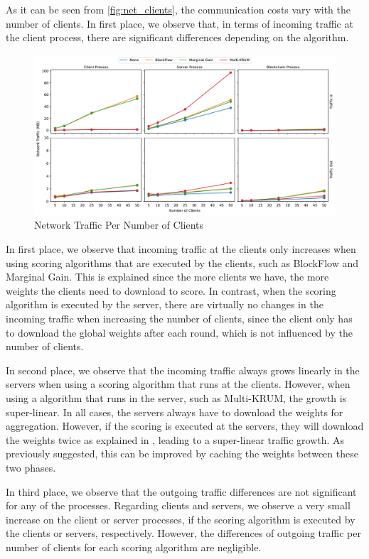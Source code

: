 As it can be seen from \autoref{fig:net_clients}, the communication costs vary with the number of clients. In first place, we observe that, in terms of incoming traffic at the client process, there are significant differences depending on the algorithm.

\begin{figure}[!hb]
    \centering
    \includegraphics[width=\textwidth]{graphics/clients/traffic.pdf}
    \caption{Network Traffic Per Number of Clients}
    \label{fig:net_clients}
\end{figure}

In first place, we observe that incoming traffic at the clients only increases when using scoring algorithms that are executed by the clients, such as BlockFlow and Marginal Gain. This is explained since the more clients we have, the more weights the clients need to download to score. In contrast, when the scoring algorithm is executed by the server, there are virtually no changes in the incoming traffic when increasing the number of clients, since the client only has to download the global weights after each round, which is not influenced by the number of clients.

In second place, we observe that the incoming traffic always grows linearly in the servers when using a scoring algorithm that runs at the clients. However, when using a algorithm that runs in the server, such as Multi-KRUM, the growth is super-linear. In all cases, the servers always have to download the weights for aggregation. However, if the scoring is executed at the servers, they will download the weights twice as explained in , leading to a super-linear traffic growth. As previously suggested, this can be improved by caching the weights between these two phases.

In third place, we observe that the outgoing traffic differences are not significant for any of the processes. Regarding clients and servers, we observe a very small increase on the client or server processes, if the scoring algorithm is executed by the clients or servers, respectively. However, the differences of outgoing traffic per number of clients for each scoring algorithm are negligible.

